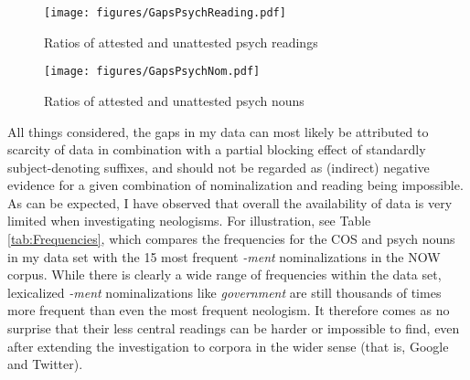\begin{figure}
	\texttt{[image: figures/GapsPsychReading.pdf]}
	\caption{Ratios of attested and unattested psych readings}
	\label{fig:GapsByReadingPsych}
\end{figure}

\begin{figure}
	\texttt{[image: figures/GapsPsychNom.pdf]}
	\caption{Ratios of attested and unattested psych nouns}
	\label{fig:GapsByNomPsych}
\end{figure}
	
All things considered, the gaps in my data can most likely be attributed to scarcity of data in combination with a partial blocking effect of standardly sub\-ject-de\-noting suffixes, and should not be regarded as (indirect) negative evidence for a given combination of nominalization and reading being impossible. 
As can be expected, I have observed that overall the availability of data is very limited when investigating neologisms. 
For illustration, see Table \ref{tab:Frequencies}, which compares the frequencies for the COS and psych nouns in my data set with the 15 most frequent \textit{-ment} nominalizations in the NOW corpus. 
While there is clearly a wide range of frequencies within the data set, lexicalized \textit{-ment} nominalizations like \textit{government} are still thousands of times more frequent than even the most frequent neologism. It therefore comes as no surprise that their less central readings can be harder or impossible to find, even after extending the investigation to corpora in the wider sense (that is, Google and Twitter).\largerpage[-2] 

